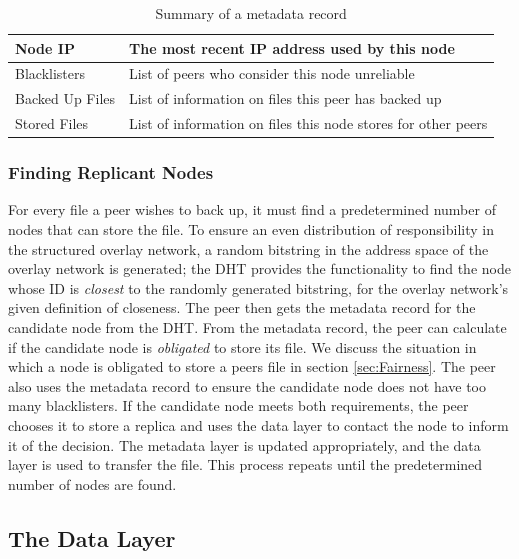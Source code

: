 \documentclass[12pt]{report}
\begin{document}
\begin{table}
\begin{center}
    \begin{tabular}{| l | l |}
    \hline
    Node IP & The most recent IP address used by this node\\ \hline
    Blacklisters & List of peers who consider this node unreliable\\ \hline
    Backed Up Files & List of information on files this peer has backed up \\ \hline
    Stored Files & List of information on files this node stores for other peers \\ \hline
    \end{tabular}
    \caption{Summary of a metadata record}
    \label{tab:metadataRecord}
\end{center}
\end{table}

\subsubsection{Finding Replicant Nodes} \label{subsubsec:FindingReplicantNodes}

For every file a peer wishes to back up, it must find a predetermined number of nodes that can store the file. To ensure an even distribution of responsibility in the structured overlay network, a random bitstring in the address space of the overlay network is generated; the DHT provides the functionality to find the node whose ID is \textit{closest} to the randomly generated bitstring, for the overlay network's given definition of closeness. The peer then gets the metadata record for the candidate node from the DHT. From the metadata record, the peer can calculate if the candidate node is \textit{obligated} to store its file. We discuss the situation in which a node is obligated to store a peers file in section \ref{sec:Fairness}. The peer also uses the metadata record to ensure the candidate node does not have too many blacklisters. If the candidate node meets both requirements, the peer chooses it to store a replica and uses the data layer to contact the node to inform it of the decision. The metadata layer is updated appropriately, and the data layer is used to transfer the file. This process repeats until the predetermined number of nodes are found.

\subsection{The Data Layer} \label{subsec:TheDataLayer}
\end{document}
